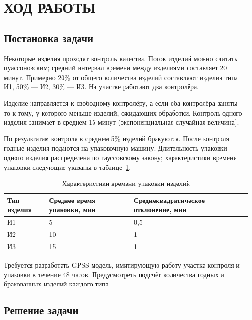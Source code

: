 \section{ХОД РАБОТЫ}

\subsection{Постановка задачи}

Некоторые изделия проходят контроль качества.
Поток изделий можно считать пуассоновским; средний интервал времени
между изделиями составляет 20 минут. 
Примерно 20\% от общего количества изделий составляют изделия типа И1,
50\% --- И2, 30\% --- И3.
На участке работают два контролёра.

Изделие направляется к свободному контролёру, а если оба контролёра заняты
--- то к тому, у которого меньше изделий, ожидающих обработки.
Контроль одного изделия занимает в среднем 15 минут
(экспоненциальная случайная величина).

По результатам контроля в среднем 5\% изделий бракуются. После контроля
годные изделия подаются на упаковочную машину. Длительность упаковки
одного изделия распределена по гауссовскому закону;
характеристики времени упаковки следующие указаны в
таблице~\ref{tbl:source_data}.

\begin{table}[h!]
  \caption{Характеристики времени упаковки изделий}
  \label{tbl:source_data}
  \centering
  \begin{tabular}{| p{} | p{} | p{} |}
    \hline
    Тип изделия &
    Среднее время \newline упаковки, мин &
    Среднеквадратическое \newline отклонение, мин \\
    \hline
    И1 & 5 & 0{,}5 \\
    \hline
    И2 & 10 & 1 \\
    \hline
    И3 & 15 & 1 \\
    \hline
    \end{tabular}
\end{table}

Требуется разработать GPSS-модель, имитирующую работу участка контроля и
упаковки в течение 48 часов.
Предусмотреть подсчёт количества годных и бракованных изделий каждого типа.

\subsection{Решение задачи}

